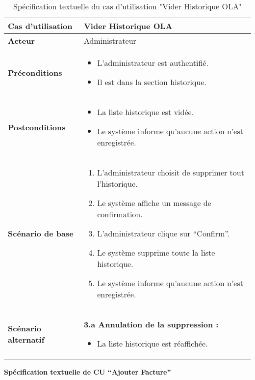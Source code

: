 \documentclass[a4paper,11pt]{report}
\begin{document}
\begin{table}[H]
  \centering
  \renewcommand{\arraystretch}{1.5}
  \caption{Spécification textuelle du cas d'utilisation "Vider Historique OLA"}
  \begin{tabularx}{\textwidth}{|l|X|}
    \hline
    \textbf{Cas d'utilisation} & Vider Historique OLA \\ \hline
    \textbf{Acteur}            & Administrateur \\ \hline
    \textbf{Préconditions}     & 
      \begin{itemize}
        \item L’administrateur est authentifié.
        \item Il est dans la section historique.
      \end{itemize} \\ \hline
    \textbf{Postconditions}    & 
      \begin{itemize}
        \item La liste historique est vidée.
        \item Le système informe qu’aucune action n’est enregistrée.
      \end{itemize} \\ \hline
    \textbf{Scénario de base}  & 
      \begin{enumerate}
        \item L’administrateur choisit de supprimer tout l’historique.
        \item Le système affiche un message de confirmation.
        \item L’administrateur clique sur “Confirm”.
        \item Le système supprime toute la liste historique.
        \item Le système informe qu’aucune action n’est enregistrée.
      \end{enumerate} \\ \hline
    \textbf{Scénario alternatif} & 
      \textbf{3.a Annulation de la suppression :}
      \begin{itemize}
        \item La liste historique est réaffichée.
      \end{itemize} \\ \hline
  \end{tabularx}
\end{table}


\textbf{Spécification textuelle de CU “Ajouter Facture”}
\end{document}
